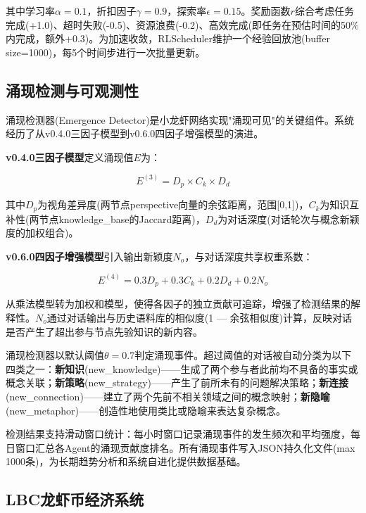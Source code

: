 \documentclass[12pt,a4paper]{ctexart}
\begin{document}
其中学习率$\alpha=0.1$，折扣因子$\gamma=0.9$，探索率$\epsilon=0.15$。奖励函数$r$综合考虑任务完成(+1.0)、超时失败(-0.5)、资源浪费(-0.2)、高效完成(即任务在预估时间的50\%内完成，额外+0.3)。为加速收敛，RLScheduler维护一个经验回放池(buffer size=1000)，每5个时间步进行一次批量更新。

\subsection{涌现检测与可观测性}

涌现检测器(Emergence Detector)是小龙虾网络实现"涌现可见"的关键组件。系统经历了从v0.4.0三因子模型到v0.6.0四因子增强模型的演进。

\textbf{v0.4.0三因子模型}定义涌现值$E$为：

\begin{equation}
E^{(3)} = D_p \times C_k \times D_d
\label{eq:emergence3}
\end{equation}

其中$D_p$为视角差异度(两节点perspective向量的余弦距离，范围[0,1])，$C_k$为知识互补性(两节点knowledge\_base的Jaccard距离)，$D_d$为对话深度(对话轮次与概念新颖度的加权组合)。

\textbf{v0.6.0四因子增强模型}引入输出新颖度$N_o$，与对话深度共享权重系数：

\begin{equation}
E^{(4)} = 0.3 D_p + 0.3 C_k + 0.2 D_d + 0.2 N_o
\label{eq:emergence4}
\end{equation}

从乘法模型转为加权和模型，使得各因子的独立贡献可追踪，增强了检测结果的解释性。$N_o$通过对话输出与历史语料库的相似度(1 — 余弦相似度)计算，反映对话是否产生了超出参与节点先验知识的新内容。

涌现检测器以默认阈值$\theta=0.7$判定涌现事件。超过阈值的对话被自动分类为以下四类之一：\textbf{新知识}(new\_knowledge)——生成了两个参与者此前均不具备的事实或概念关联；\textbf{新策略}(new\_strategy)——产生了前所未有的问题解决策略；\textbf{新连接}(new\_connection)——建立了两个先前不相关领域之间的概念映射；\textbf{新隐喻}(new\_metaphor)——创造性地使用类比或隐喻来表达复杂概念。

检测结果支持滑动窗口统计：每小时窗口记录涌现事件的发生频次和平均强度，每日窗口汇总各Agent的涌现贡献度排名。所有涌现事件写入JSON持久化文件(max 1000条)，为长期趋势分析和系统自进化提供数据基础。

\subsection{LBC龙虾币经济系统}
\end{document}
